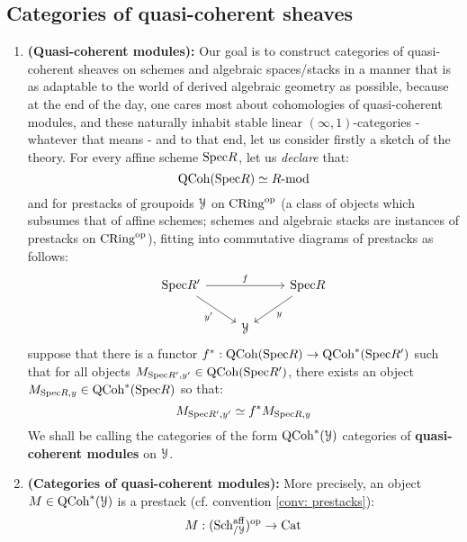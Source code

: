         \subsection{Categories of quasi-coherent sheaves}
            \begin{definition} \label{def: qcoh_def}
                \noindent
                \begin{enumerate}
                    \item \textbf{(Quasi-coherent modules):} Our goal is to construct categories of quasi-coherent sheaves on schemes and algebraic spaces/stacks in a manner that is as adaptable to the world of derived algebraic geometry as possible, because at the end of the day, one cares most about cohomologies of quasi-coherent modules, and these  naturally inhabit stable linear $(\infty,1)$-categories - whatever that means - and to that end, let us consider firstly a sketch of the theory. For every affine scheme $\mathrm{Spec} R$, let us \textit{declare} that:
                        $$\mathrm{QCoh}(\mathrm{Spec} R) \simeq R\text{-}\mathrm{mod}$$
                    and for prestacks of groupoids $\mathcal{Y}$ on $\mathrm{CRing}^{\mathrm{op}}$ (a class of objects which subsumes that of affine schemes; schemes and algebraic stacks are instances of prestacks on $\mathrm{CRing}^{\mathrm{op}}$), fitting into commutative diagrams of prestacks as follows:
                        $$
                            \begin{tikzcd}
                            	{\Spec R'} && {\Spec R} \\
                            	& \calY
                            	\arrow["{y'}"', from=1-1, to=2-2]
                            	\arrow["y", from=1-3, to=2-2]
                            	\arrow["f", from=1-1, to=1-3]
                            \end{tikzcd}
                        $$
                    suppose that there is a functor $f^*: \mathrm{QCoh}(\mathrm{Spec} R) \to \mathrm{QCoh}^*(\mathrm{Spec} R')$ such that for all objects $M_{\mathrm{Spec} R', y'} \in \mathrm{QCoh}(\mathrm{Spec} R')$, there exists an object $M_{\mathrm{Spec} R, y} \in \mathrm{QCoh}^*(\mathrm{Spec} R)$ so that:
                        $$M_{\mathrm{Spec} R', y'} \simeq f^* M_{\mathrm{Spec} R, y}$$
                    We shall be calling the categories of the form $\mathrm{QCoh}^*(\mathcal{Y})$ categories of \textbf{quasi-coherent modules} on $\mathcal{Y}$.
                    \item \textbf{(Categories of quasi-coherent modules):} More precisely, an object $M \in \mathrm{QCoh}^*(\mathcal{Y})$ is a prestack (cf. convention \ref{conv: prestacks}):
                        $$M: (\mathrm{Sch}^{\mathrm{aff}}_{/\mathcal{Y}})^{\mathrm{op}} \to \mathrm{Cat}$$

\end{enumerate}
\end{definition}
